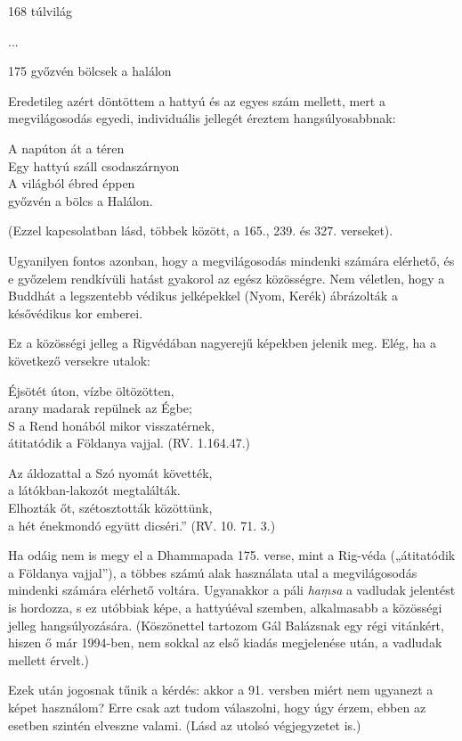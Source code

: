 
\begin{notesdescription}

\item[{168}
{túlvilág}
{}] \hfill\par

...

\item[{175}
{győzvén bölcsek a halálon}
{}] \hfill\par

Eredetileg azért döntöttem a hattyú és az egyes szám mellett, mert a megvilágosodás egyedi, individuális jellegét éreztem hangsúlyosabbnak:

A napúton át a téren\\
Egy hattyú száll csodaszárnyon\\
A világból ébred éppen\\
győzvén a bölcs a Halálon.

(Ezzel kapcsolatban lásd, többek között, a 165., 239. és 327. verseket).

Ugyanilyen fontos azonban, hogy a megvilágosodás mindenki számára elérhető, és e győzelem rendkívüli hatást gyakorol az egész közösségre. Nem véletlen, hogy a Buddhát a legszentebb védikus jelképekkel (Nyom, Kerék) ábrázolták a késővédikus kor emberei.

Ez a közösségi jelleg a Rigvédában nagyerejű képekben jelenik meg. Elég, ha a következő versekre utalok:

Éjsötét úton, vízbe öltözötten,\\
arany madarak repülnek az Égbe;\\
S a Rend honából mikor visszatérnek,\\
átitatódik a Földanya vajjal. (RV. 1.164.47.)

Az áldozattal a Szó nyomát követték,\\
a látókban-lakozót megtalálták.\\
Elhozták őt, szétosztották közöttünk,\\
a hét énekmondó együtt dicséri.” (RV. 10. 71. 3.)

Ha odáig nem is megy el a Dhammapada 175. verse, mint a Rig-véda („átitatódik a Földanya vajjal”), a többes számú alak használata utal a megvilágosodás mindenki számára elérhető voltára. Ugyanakkor a páli \textit{haṃsa} a vadludak jelentést is hordozza, s ez utóbbiak képe, a hattyúéval szemben, alkalmasabb a közösségi jelleg hangsúlyozására. (Köszönettel tartozom Gál Balázsnak egy régi vitánkért, hiszen ő már 1994-ben, nem sokkal az első kiadás megjelenése után, a vadludak mellett érvelt.)

Ezek után jogosnak tűnik a kérdés: akkor a 91. versben miért nem ugyanezt a képet használom? Erre csak azt tudom válaszolni, hogy úgy érzem, ebben az esetben szintén elveszne valami. (Lásd az utolsó végjegyzetet is.)

\end{notesdescription}

